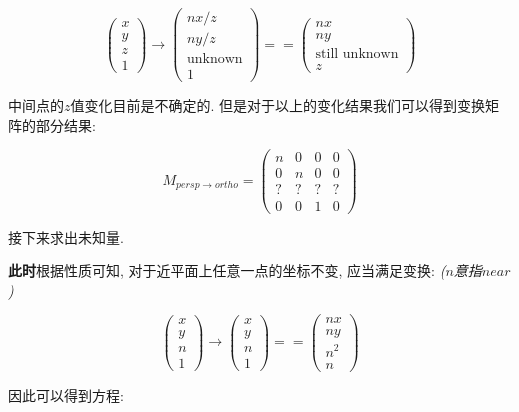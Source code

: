 \begin{equation}
	\begin{pmatrix}x\\y\\z\\1\end{pmatrix}\rightarrow\begin{pmatrix}nx/z\\ny/z\\\text{unknown}\\1\end{pmatrix}==\begin{pmatrix}nx\\ny\\\text{still unknown}\\z\end{pmatrix}
\end{equation}

中间点的$z$值变化目前是不确定的. 但是对于以上的变化结果我们可以得到变换矩阵的部分结果: 

\begin{equation}
	M_{persp\rightarrow ortho}=\begin{pmatrix}n&0&0&0\\0&n&0&0\\?&?&?&?\\0&0&1&0\end{pmatrix}
\end{equation}

接下来求出未知量. 

\textbf{此时}根据性质可知, 对于近平面上任意一点的坐标不变, 应当满足变换: \quad\textit{($n$意指$near$)}

\begin{equation}
	\begin{pmatrix}x\\y\\n\\1\end{pmatrix}\rightarrow\begin{pmatrix}x\\y\\n\\1\end{pmatrix}==\begin{pmatrix}nx\\ny\\n^2\\n\end{pmatrix}
\end{equation}

因此可以得到方程: 

